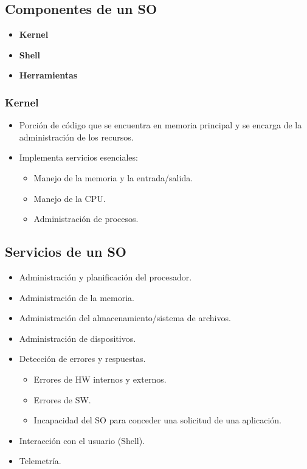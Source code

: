 \subsection{Componentes de un SO}
\begin{itemize}
    \item \textbf{Kernel}
    \item \textbf{Shell}
    \item \textbf{Herramientas}
\end{itemize}

\subsubsection{Kernel}
\begin{itemize}
    \item Porción de código que se encuentra en memoria principal y se encarga de la administración de los recursos.
    \item Implementa servicios esenciales:
        \begin{itemize}
            \item Manejo de la memoria y la entrada/salida.
            \item Manejo de la CPU.
            \item Administración de procesos.
        \end{itemize}
\end{itemize}

\subsection{Servicios de un SO}
\begin{itemize}
    \item Administración y planificación del procesador.
    \item Administración de la memoria.
    \item Administración del almacenamiento/sistema de archivos.
    \item Administración de dispositivos.
    \item Detección de errores y respuestas.
        \begin{itemize}
            \item Errores de HW internos y externos.
            \item Errores de SW.
            \item Incapacidad del SO para conceder una solicitud de una aplicación.
        \end{itemize}
    \item Interacción con el usuario (Shell).
    \item Telemetría.
\end{itemize}

